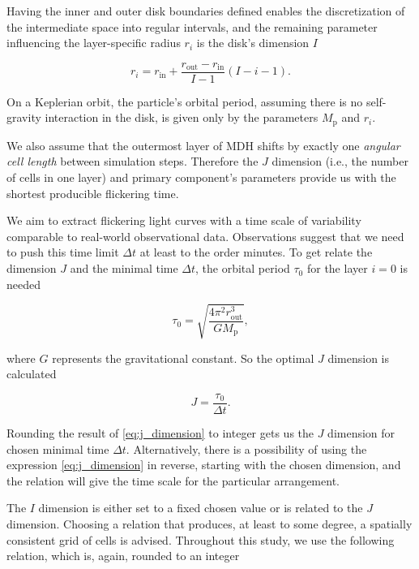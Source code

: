     Having the inner and outer disk boundaries defined enables the discretization of the intermediate space into regular intervals, and the remaining parameter influencing the layer-specific radius $r_i$ is the disk's dimension $I$

    \begin{equation}
        r_i = r_{\mathrm{in}} + \frac{r_{\mathrm{out}} - r_{\mathrm{in}}}{I - 1} (I - i - 1).
    \end{equation}

    On a Keplerian orbit, the particle's orbital period, assuming there is no self-gravity interaction in the disk, is given only by the parameters $M_{\mathrm{p}}$ and $r_i$. 


    We also assume that the outermost layer of MDH shifts by exactly one \emph{angular cell length} between simulation steps. Therefore the $J$ dimension (i.e., the number of cells in one layer) and primary component's parameters provide us with the shortest producible flickering time.

    We aim to extract flickering light curves with a time scale of variability comparable to real-world observational data. Observations suggest that we need to push this time limit $\Delta t$ at least to the order minutes. To get relate the dimension $J$ and the minimal time $\Delta t$, the orbital period $\tau_{0}$ for the layer $i=0$ is needed

    \begin{equation}
        \tau_{0} = \sqrt{\frac{4 \pi^2 r_{\mathrm{out}}^3}{G M_{\mathrm{p}}}},
        \label{eq:outer_layer_tau}
    \end{equation}

    where $G$ represents the gravitational constant. So the optimal $J$ dimension is calculated

    \begin{equation}
        J = \frac{\tau_{0}}{\Delta t}.
        \label{eq:j_dimension}
    \end{equation}

    Rounding the result of \eqref{eq:j_dimension} to integer gets us the $J$ dimension for chosen minimal time $\Delta t$. Alternatively, there is a possibility of using the expression \eqref{eq:j_dimension} in reverse, starting with the chosen dimension, and the relation will give the time scale for the particular arrangement.

    The $I$ dimension is either set to a fixed chosen value or is related to the $J$ dimension. Choosing a relation that produces, at least to some degree, a spatially consistent grid of cells is advised. Throughout this study, we use the following relation, which is, again, rounded to an integer 

